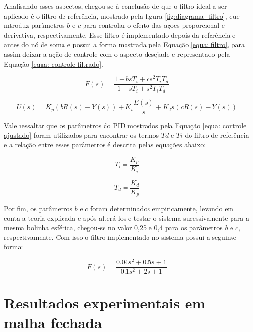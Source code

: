 \documentclass{ifacconf}
\begin{document}
Analisando esses aspectos, chegou-se à conclusão de que o filtro ideal a ser aplicado é o filtro de referência, mostrado pela figura \ref{fig:diagrama_filtro}, que introduz parâmetros $b$ e $c$ para controlar o efeito das ações 
proporcional e derivativa, respectivamente. Esse filtro é implementado depois da referência e antes do nó de soma e possui a forma mostrada pela Equação \ref{equa: filtro}, para assim deixar 
a ação de controle com o aspecto desejado e representado pela Equação \ref{equa: controle filtrado}.

\begin{equation}
  F(s) = \frac{1+bsT_{i}+cs^2T_{i}T_{d}}{1+sT_{i}+s^2T_{i}T_{d}}
  \label{equa: filtro}
\end{equation}

\begin{equation}
  U(s) = K_{p}(bR(s)-Y(s)) + K_{i}\frac{E(s)}{s} + K_{d}s(cR(s)-Y(s))
  \label{equa: controle filtrado}
\end{equation}

Vale ressaltar que os parâmetros do PID mostrados pela Equação \ref{equa: controle ajustado} foram utilizados para encontrar os termos $Td$ e $Ti$ do filtro de referência e a relação entre esses parâmetros 
é descrita pelas equações abaixo:

\begin{equation*}
  T_{i} = \frac{K_{p}}{K_{i}}
  \label{equa: ti}
\end{equation*}

\begin{equation*}
  T_{d} = \frac{K_{d}}{K_{p}}
  \label{equa: td}
\end{equation*}

Por fim, os parâmetros $b$ e $c$ foram determinados empiricamente, levando em conta a teoria explicada e após alterá-los e testar o sistema sucessivamente para a mesma bolinha esférica, 
chegou-se no valor 0,25 e 0,4 para os parâmetros $b$ e $c$, respectivamente. Com isso o filtro implementado no sistema possui a seguinte forma:

\begin{equation}
  F(s) = \frac{0.04s^2+0.5s+1}{0.1s^2+2s+1}
  \label{equa: filtro completo}
\end{equation}


\section{Resultados experimentais em malha fechada}
\end{document}

